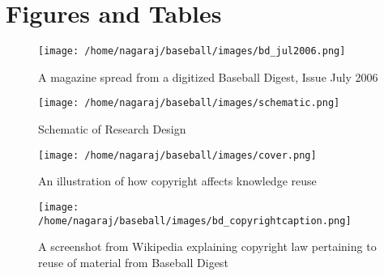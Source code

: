 \documentclass[12pt]{article}
\begin{document}
\newpage
\section{Figures and Tables}

\begin{figure}[h]
\centering
\texttt{[image: /home/nagaraj/baseball/images/bd\_jul2006.png]}
\caption{A magazine spread from a digitized Baseball Digest, Issue July 2006}
\label{fig:googlebooks}
\end{figure}

\begin{figure}[h]
\centering
\texttt{[image: /home/nagaraj/baseball/images/schematic.png]}
\caption{Schematic of Research Design}
\label{fig:schematic}
\end{figure}


\begin{figure}[h]
\centering
\texttt{[image: /home/nagaraj/baseball/images/cover.png]}
\caption{An illustration of how copyright affects knowledge reuse}
\end{figure}

\begin{figure}[h]
\centering
\texttt{[image: /home/nagaraj/baseball/images/bd\_copyrightcaption.png]}
\caption{A screenshot from Wikipedia explaining copyright law pertaining to reuse of material from Baseball Digest}
\end{figure}
\end{document}
